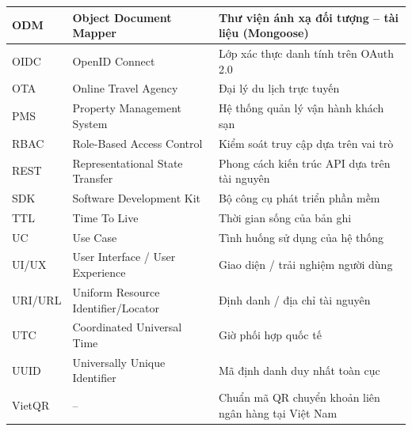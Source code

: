 \begin{rtable}
\begin{longtable}{|C{2.6cm}|L{6.2cm}|L{5.9cm}|}
ODM & Object Document Mapper & Thư viện ánh xạ đối tượng -- tài liệu (Mongoose) \\ \hline
OIDC & OpenID Connect & Lớp xác thực danh tính trên OAuth 2.0 \\ \hline
OTA & Online Travel Agency & Đại lý du lịch trực tuyến \\ \hline
PMS & Property Management System & Hệ thống quản lý vận hành khách sạn \\ \hline
RBAC & Role-Based Access Control & Kiểm soát truy cập dựa trên vai trò \\ \hline
REST & Representational State Transfer & Phong cách kiến trúc API dựa trên tài nguyên \\ \hline
SDK & Software Development Kit & Bộ công cụ phát triển phần mềm \\ \hline
TTL & Time To Live & Thời gian sống của bản ghi \\ \hline
UC & Use Case & Tình huống sử dụng của hệ thống \\ \hline
UI/UX & User Interface / User Experience & Giao diện / trải nghiệm người dùng \\ \hline
URI/URL & Uniform Resource Identifier/Locator & Định danh / địa chỉ tài nguyên \\ \hline
UTC & Coordinated Universal Time & Giờ phối hợp quốc tế \\ \hline
UUID & Universally Unique Identifier & Mã định danh duy nhất toàn cục \\ \hline
VietQR & -- & Chuẩn mã QR chuyển khoản liên ngân hàng tại Việt Nam \\ \hline
\end{longtable}
\end{rtable}
